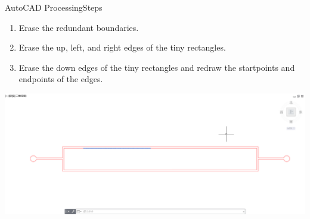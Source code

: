 \documentclass[10pt]{beamer}
\begin{document}
\begin{frame}{AutoCAD Processing}{Steps}
    \begin{enumerate}
        \item Erase the redundant boundaries.
        \item Erase the up, left, and right edges of the tiny rectangles.
        \item Erase the down edges of the tiny rectangles and redraw the startpoints and endpoints of the edges.
    \end{enumerate}
    \includegraphics[width=\textwidth]{3.png}
\end{frame}
\end{document}
